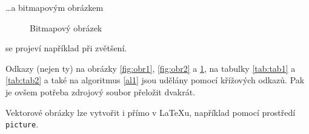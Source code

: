 \documentclass[a4paper, 11pt]{article}
\begin{document}
{\noindent \dots a bitmapovým obrázkem}
\begin{figure}[ht]
    \centering
    \caption{Bitmapový obrázek}
    \label{fig:obr3}
\end{figure}

{\noindent se projeví například při zvětšení.}

Odkazy (nejen ty) na obrázky \ref{fig:obr1}, \ref{fig:obr2} a \ref{fig:obr3}, na  tabulky \ref{tab:tab1} a \ref{tab:tab2} a také na algoritmus \ref{al1} jsou udělány pomocí křížových odkazů. Pak je ovšem potřeba zdrojový soubor přeložit dvakrát.

Vektorové obrázky lze vytvořit i přímo v \LaTeX u, například pomocí prostředí 
\texttt{picture}.

\newpage
\end{document}

